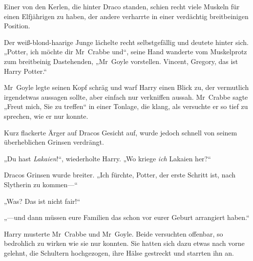 Einer von den Kerlen, die hinter Draco standen, schien recht viele Muskeln für einen Elfjährigen zu haben, der andere verharrte in einer verdächtig breitbeinigen Position.

Der weiß-blond-haarige Junge lächelte recht selbstgefällig und deutete hinter sich. „Potter, ich möchte dir Mr~Crabbe und“, seine Hand wanderte vom Muskelprotz zum breitbeinig Dastehenden, „Mr~Goyle vorstellen. Vincent, Gregory, das ist Harry Potter.“

Mr~Goyle legte seinen Kopf schräg und warf Harry einen Blick zu, der vermutlich irgendetwas aussagen sollte, aber einfach nur verkniffen aussah. Mr~Crabbe sagte „Freut mich, Sie zu treffen“ in einer Tonlage, die klang, als versuchte er so tief zu sprechen, wie er nur konnte.

Kurz flackerte Ärger auf Dracos Gesicht auf, wurde jedoch schnell von seinem überheblichen Grinsen verdrängt.

„Du hast \emph{Lakaien}!“, wiederholte Harry. „Wo kriege \emph{ich} Lakaien her?“

Dracos Grinsen wurde breiter. „Ich fürchte, Potter, der erste Schritt ist, nach Slytherin zu kommen—“

„Was? Das ist nicht fair!“

„—und dann müssen eure Familien das schon vor eurer Geburt arrangiert haben.“

Harry musterte Mr~Crabbe und Mr~Goyle. Beide versuchten offenbar, so bedrohlich zu wirken wie sie nur konnten. Sie hatten sich dazu etwas nach vorne gelehnt, die Schultern hochgezogen, ihre Hälse gestreckt und starrten ihn an.

